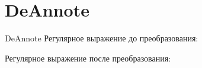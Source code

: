 \section{DeAnnote}
\begin{frame}{DeAnnote}
	Регулярное выражение до преобразования:

	Регулярное выражение после преобразования:

\end{frame}
